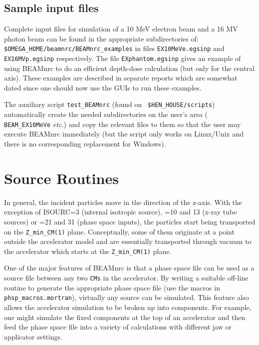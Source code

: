 \documentclass[12pt,twoside]{article}
\newcommand{\etc}{{\em etc.}}
\begin{document}
\subsection{Sample input files}
 

Complete input files for simulation of a 10 MeV electron beam and a 16 MV
photon beam can be found in the appropriate subdirectories of:\\
\verb+$OMEGA_HOME/beamnrc/BEAMnrc_examples+
in files \verb+EX10MeVe.egsinp+ and \verb+EX16MVp.egsinp+
respectively. The file \verb+EXphantom.egsinp+ gives an example
of using BEAMnrc to do an efficient depth-dose calculation (but only for
the central axis).  These examples are described in
separate reports\cite{SR95,ZR95,WR95} which are somewhat dated since one
should now use the GUIs to run these examples.

The auxiliary script \verb+test_BEAMnrc+ (found on {\tt
\$HEN\_HOUSE/scripts})
automatically create the needed subdirectories on the user's area ({\tt
BEAM\_EX10MeVe} \etc) and
copy the relevant files to them so that the user may execute BEAMnrc
immediately (but the script only works on Linux/Unix and there is
no corresponding replacement for Windows).
\clearpage
\section{Source Routines}

In general, the incident particles move in the direction of the z-axis.  With
the exception of ISOURC=3 (internal isotropic source), =10 and 13 (x-ray
tube sources)  or =21 and 31 (phase space
inputs), the particles start being transported on the \verb+Z_min_CM(1)+
plane.  Conceptually, some of them originate at a point outside the accelerator
model and are essentially transported through vacuum to the accelerator
which starts at the \verb+Z_min_CM(1)+ plane.

One of the major features of BEAMnrc is that a
phase space file can be used as a source file between
any two  \verb+CMs+ in the accelerator. By writing a suitable off-line routine
to generate the appropriate phase space file
(use the macros in {\tt phsp\_macros.mortran}),
virtually any source can be simulated.  This feature also allows the accelerator
simulation to be broken up into components. For example, one might
simulate the fixed components at the top of an accelerator and then feed
the phase space file into a variety of calculations with different jaw
or applicator settings.
\end{document}
